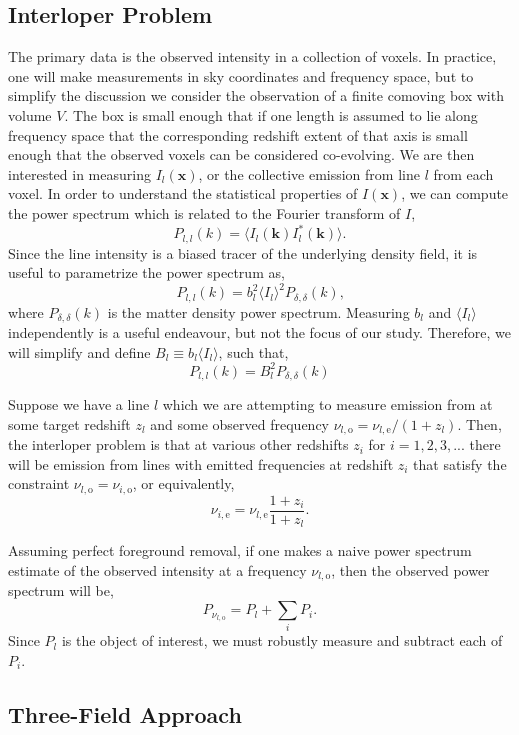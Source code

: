 \documentclass{aastex62}
\newcommand{\beq}{\begin{equation}}
\newcommand{\eeq}{\end{equation}}
\newcommand{\mynu}[2]{\ensuremath{\nu_{#1,\text{#2}}}}
\newcommand{\denps}{\ensuremath{P_{\delta,\delta}}}
\newcommand{\avg}[1]{\ensuremath{\langle #1 \rangle}}
\begin{document}
\subsection{Interloper Problem}\label{ssec:interloper}
The primary data is the observed intensity in a collection of voxels. In
practice, one will make measurements in sky coordinates and frequency space,
but to simplify the discussion we consider the observation of a finite
comoving box with volume $V$. The box is small enough that if one length is
assumed to lie along frequency space that the corresponding redshift extent of
that axis is small enough that the observed voxels can be considered
co-evolving. We are then interested in measuring $I_{l}(\bm{x})$, or the
collective emission from line $l$ from each voxel. In order to understand the
statistical properties of $I(\bm{x})$, we can compute the power spectrum which
is related to the Fourier transform of $I$,
\beq
P_{l,l}(k) = \avg{I_l(\bm{k}) I_l^{*}(\bm{k})}\text{.}
\eeq
Since the line intensity is a biased tracer of the underlying density field,
it is useful to parametrize the power spectrum as,
\beq
P_{l,l}(k) = b_l^2 \avg{I_l}^2 \denps(k)\text{,}
\eeq
where $\denps(k)$ is the matter density power spectrum. Measuring
$b_l$ and $\avg{I_l}$ independently is a useful endeavour, but not the focus
of our study. Therefore, we will simplify and define $B_l \equiv b_l
\avg{I_l}$, such that,
\beq
P_{l,l}(k) = B_l^2 \denps(k)
\eeq

Suppose we have a line $l$ which we are attempting to measure emission from at
some target redshift $z_l$ and some observed frequency $\mynu{l}{o} =
\mynu{l}{e}/(1+z_l)$. Then, the interloper problem is that at various other
redshifts $z_i$ for $i=1,2,3,...$ there will be emission from lines with
emitted frequencies at redshift $z_i$ that satisfy the constraint $\mynu{l}{o}
= \mynu{i}{o}$, or equivalently,
\beq
\mynu{i}{e} = \mynu{l}{e}\frac{1+z_i}{1+z_l}\text{.}
\eeq

Assuming perfect foreground removal, if one makes a naive power spectrum
estimate of the observed intensity at a frequency $\mynu{l}{o}$, then the
observed power spectrum will be,
\beq\label{eq:observed_with_int}
P_{\mynu{l}{o}} = P_{l} + \sum_{i} P_{i}\text{.}
\eeq
Since $P_l$ is the object of interest, we must robustly measure and subtract
each of $P_i$.

\subsection{Three-Field Approach}\label{ssec:three_field}
\end{document}
